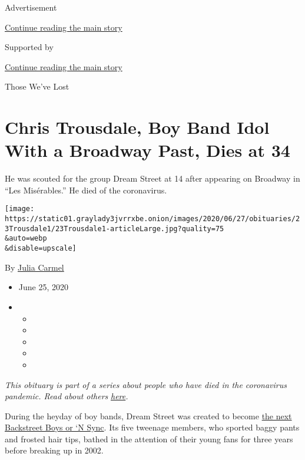 Advertisement

\protect\hyperlink{after-top}{Continue reading the main story}

Supported by

\protect\hyperlink{after-sponsor}{Continue reading the main story}

Those We've Lost

\hypertarget{chris-trousdale-boy-band-idol-with-a-broadway-past-dies-at-34}{%
\section{Chris Trousdale, Boy Band Idol With a Broadway Past, Dies at
34}\label{chris-trousdale-boy-band-idol-with-a-broadway-past-dies-at-34}}

He was scouted for the group Dream Street at 14 after appearing on
Broadway in ``Les Misérables.'' He died of the coronavirus.

\texttt{[image: https://static01.graylady3jvrrxbe.onion/images/2020/06/27/obituaries/23Trousdale1/23Trousdale1-articleLarge.jpg?quality=75\\\&auto=webp\\\&disable=upscale]}

By \href{https://www.nytimes3xbfgragh.onion/by/julia-carmel}{Julia
Carmel}

\begin{itemize}
\item
  June 25, 2020
\item
  \begin{itemize}
  \item
  \item
  \item
  \item
  \item
  \end{itemize}
\end{itemize}

\emph{This obituary is part of a series about people who have died in
the coronavirus pandemic. Read about others}
\href{https://www.nytimes3xbfgragh.onion/interactive/2020/obituaries/people-died-coronavirus-obituaries.html}{\emph{here}}\emph{.}

During the heyday of boy bands, Dream Street was created to become
\href{https://www.nytimes3xbfgragh.onion/2004/10/24/nyregion/a-girl-singing-group-aims-for-the-stars.html}{the
next Backstreet Boys or `N Sync}. Its five tweenage members, who sported
baggy pants and frosted hair tips, bathed in the attention of their
young fans for three years before breaking up in 2002.


